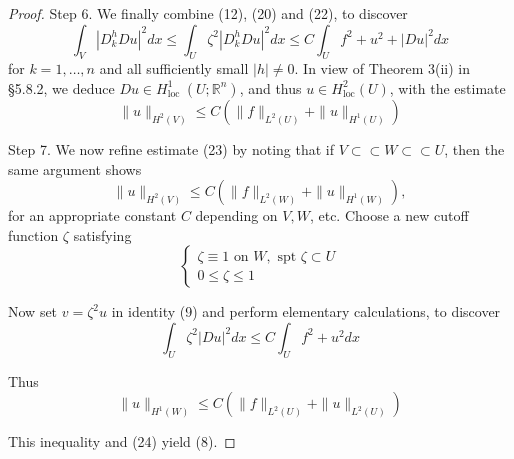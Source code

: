 \begin{theorem}
\begin{proof}
        Step 6.
        We finally combine (12), (20) and (22), to discover
        \begin{equation*}
            \int_V\left|D_k^h D u\right|^2 d x \leq \int_U \zeta^2\left|D_k^h D u\right|^2 d x \leq C \int_U f^2+u^2+|D u|^2 d x
        \end{equation*}
        for $k=1, \ldots, n$ and all sufficiently small $|h| \neq 0$.
        In view of Theorem 3(ii) in §5.8.2, we deduce $D u \in H_{\text {loc }}^1\left(U ; \mathbb{R}^n\right)$, and thus $u \in H_{\mathrm{loc}}^2(U)$, with the estimate
        \begin{equation*}
            \|u\|_{H^2(V)} \leq C\left(\|f\|_{L^2(U)}+\|u\|_{H^1(U)}\right)
        \end{equation*}

        Step 7.
        We now refine estimate (23) by noting that if $V \subset \subset W \subset \subset U$, then the same argument shows
        \begin{equation*}
            \|u\|_{H^2(V)} \leq C\left(\|f\|_{L^2(W)}+\|u\|_{H^1(W)}\right),
        \end{equation*}
        for an appropriate constant $C$ depending on $V, W$, etc. Choose a new cutoff function $\zeta$ satisfying
        \begin{equation*}
            \left\{\begin{array}{l}
                \zeta \equiv 1 \text { on } W, \text { spt } \zeta \subset U \\
                0 \leq \zeta \leq 1
            \end{array}\right.
        \end{equation*}

        Now set $v=\zeta^2 u$ in identity (9) and perform elementary calculations, to discover
        \begin{equation*}
            \int_U \zeta^2|D u|^2 d x \leq C \int_U f^2+u^2 d x
        \end{equation*}

        Thus
        \begin{equation*}
            \|u\|_{H^1(W)} \leq C\left(\|f\|_{L^2(U)}+\|u\|_{L^2(U)}\right)
        \end{equation*}

        This inequality and (24) yield (8).
    \end{proof}



\end{theorem}

